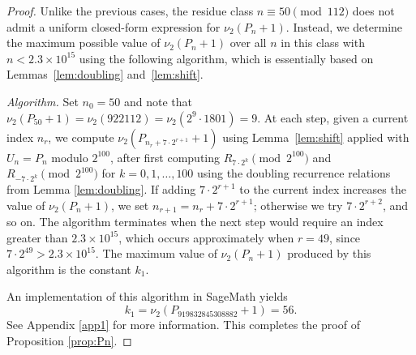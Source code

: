 \documentclass[10pt,a4paper]{amsart}
\begin{document}
\begin{proof}
	Unlike the previous cases, the residue class $n\equiv 50\pmod{112}$ does not admit 
	a uniform closed-form expression for $\nu_2(P_n+1)$. 
	Instead, we determine the maximum possible value of 
	$\nu_2(P_n+1)$ over all $n$ in this class with 
	$n<2.3\times 10^{15}$ using the following algorithm, which 
	is essentially based on Lemmas~\ref{lem:doubling} 
	and~\ref{lem:shift}.
	
	\medskip
	\noindent\textit{Algorithm.} Set $n_0=50$ and note that $\nu_2(P_{50}+1)=\nu_2(922112)=\nu_{2}(2^{9}\cdot 1801)=9$. At each step, given a current index 
	$n_r$, we compute $\nu_2(P_{n_r+7\cdot 2^{r+1}}+1)$ 
	using Lemma~\ref{lem:shift} applied with 
	$U_n=P_n$ modulo $2^{100}$, after first computing 
	$R_{7\cdot 2^k}\pmod{2^{100}}$ and 
	$R_{-7\cdot 2^k}\pmod{2^{100}}$ for 
	$k=0,1,\ldots,100$ using the doubling recurrence relations from 
	Lemma \ref{lem:doubling}. If adding $7\cdot 2^{r+1}$ 
	to the current index increases the value of $\nu_2(P_n+1)$, we set 
	$n_{r+1}=n_r+7\cdot 2^{r+1}$; otherwise we try 
	$7\cdot 2^{r+2}$, and so on. The algorithm terminates 
	when the next step would require an index greater than 
	$2.3\times 10^{15}$, which occurs approximately when
	$r=49$, since $7\cdot 2^{49}>2.3\times 10^{15}$. 
	The maximum value of $\nu_2(P_n+1)$ produced by this 
	algorithm is the constant $k_1$.
	
An implementation of this algorithm in SageMath yields 
\begin{equation*}
	k_{1}=\nu_{2}(P_{919832845308882}+1)= 56.
\end{equation*}
See Appendix \ref{app1} for more information. This completes the proof of Proposition \ref{prop:Pn}.
\end{proof}
\end{document}
